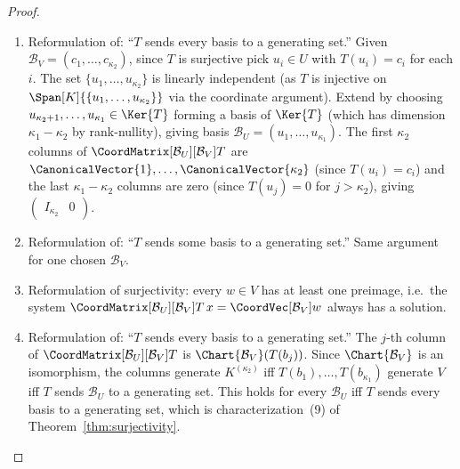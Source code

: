 \begin{proof}
    \leavevmode
    \begin{enumerate}
        \item Reformulation of: ``$T$ sends every basis to a generating set.'' Given
              $\mathcal{B}_V = (c_1, \ldots, c_{\kappa_2})$, since $T$ is surjective pick
              $u_i \in U$ with $T(u_i) = c_i$ for each $i$. The set
              $\{u_1, \ldots, u_{\kappa_2}\}$ is linearly independent (as $T$ is injective
              on $\Span[K]{\{u_1,\ldots,u_{\kappa_2}\}}$ via the coordinate argument).
              Extend by choosing $u_{\kappa_2+1}, \ldots, u_{\kappa_1} \in \Ker{T}$ forming
              a basis of $\Ker{T}$ (which has dimension $\kappa_1 - \kappa_2$ by
              rank-nullity), giving basis $\mathcal{B}_U = (u_1, \ldots, u_{\kappa_1})$.
              The first $\kappa_2$ columns of $\CoordMatrix[\mathcal{B}_U][\mathcal{B}_V]{T}$
              are $\CanonicalVector{1}, \ldots, \CanonicalVector{\kappa_2}$ (since $T(u_i) = c_i$) and the last
              $\kappa_1 - \kappa_2$ columns are zero (since $T(u_j) = 0$ for
              $j > \kappa_2$), giving $\begin{pmatrix} I_{\kappa_2} & 0 \end{pmatrix}$.

        \item Reformulation of: ``$T$ sends some basis to a generating set.'' Same argument
              for one chosen $\mathcal{B}_V$.

        \item Reformulation of surjectivity: every $w \in V$ has at least one preimage, i.e.\
              the system $\CoordMatrix[\mathcal{B}_U][\mathcal{B}_V]{T}\, x
              = \CoordVec[\mathcal{B}_V]{w}$ always has a solution.

        \item Reformulation of: ``$T$ sends every basis to a generating set.''
              The $j$-th column of $\CoordMatrix[\mathcal{B}_U][\mathcal{B}_V]{T}$
              is $\Chart{\mathcal{B}_V}(T(b_j))$.
              Since $\Chart{\mathcal{B}_V}$ is an isomorphism, the columns generate
              $K^{(\kappa_2)}$ iff $T(b_1), \ldots, T(b_{\kappa_1})$ generate $V$ iff $T$
              sends $\mathcal{B}_U$ to a generating set. This holds for every $\mathcal{B}_U$
              iff $T$ sends every basis to a generating set, which is
              characterization~(9) of Theorem~\ref{thm:surjectivity}. \qedhere
    \end{enumerate}
\end{proof}

